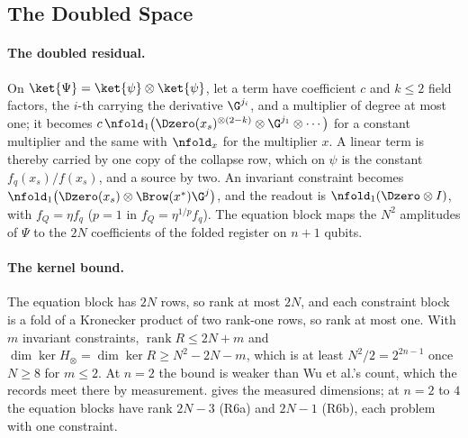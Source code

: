 \subsection{The Doubled Space}
\label{app:doubled-space}

\paragraph{The doubled residual.} On $\ket{\Psi}=\ket{\psi}\otimes\ket{\psi}$, let a term have coefficient $c$ and $k\le2$ field factors, the $i$-th carrying the derivative $\G^{j_i}$, and a multiplier of degree at most one; it becomes $c\,\nfold_1\bigl(\Dzero(x_s)^{\otimes(2-k)}\otimes\G^{j_1}\otimes\cdots\bigr)$ for a constant multiplier and the same with $\nfold_x$ for the multiplier $x$. A linear term is thereby carried by one copy of the collapse row, which on $\psi$ is the constant $f_q(x_s)/f(x_s)$, and a source by two. An invariant constraint becomes $\nfold_1\bigl(\Dzero(x_s)\otimes\Brow(x^*)\G^j\bigr)$, and the readout is $\nfold_1(\Dzero\otimes I)$, with $f_Q=\eta f_q$ ($p=1$ in $f_Q=\eta^{1/p}f_q$). The equation block maps the $N^2$ amplitudes of $\Psi$ to the $2N$ coefficients of the folded register on $n+1$ qubits.

\paragraph{The kernel bound.} The equation block has $2N$ rows, so rank at most $2N$, and each constraint block is a fold of a Kronecker product of two rank-one rows, so rank at most one. With $m$ invariant constraints, $\operatorname{rank}R\le2N+m$ and $\dim\ker H_\otimes=\dim\ker R\ge N^2-2N-m$, which is at least $N^2/2=2^{2n-1}$ once $N\ge8$ for $m\le2$. At $n=2$ the bound is weaker than Wu et al.'s count, which the records meet there by measurement.  gives the measured dimensions; at $n=2$ to $4$ the equation blocks have rank $2N-3$ (R6a) and $2N-1$ (R6b), each problem with one constraint.

